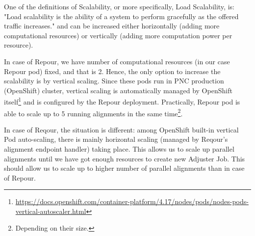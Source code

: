 \documentclass[../main.tex]{subfiles}
\begin{document}
One of the definitions of Scalability, or more specifically, Load Scalability, is: "Load scalability is the ability of a system to perform gracefully as the offered traffic increases."\cite{scalability} and can be increased either horizontally (adding more computational resources) or vertically (adding more computation power per resource).

In case of Repour, we have number of computational resources (in our case Repour pod) fixed, and that is 2. Hence, the only option to increase the scalability is by vertical scaling. Since these pods run in PNC production (OpenShift) cluster, vertical scaling is automatically managed by OpenShift itself\footnote{\url{https://docs.openshift.com/container-platform/4.17/nodes/pods/nodes-pods-vertical-autoscaler.html}} and is configured by the Repour deployment. Practically, Repour pod is able to scale up to 5 running alignments in the same time\footnote{Depending on their size.}.

In case of Reqour, the situation is different: among OpenShift built-in vertical Pod auto-scaling, there is mainly horizontal scaling (managed by Reqour's alignment endpoint handler) taking place. This allows us to scale up parallel alignments until we have got enough resources to create new Adjuster Job. This should allow us to scale up to higher number of parallel alignments than in case of Repour.
\end{document}
